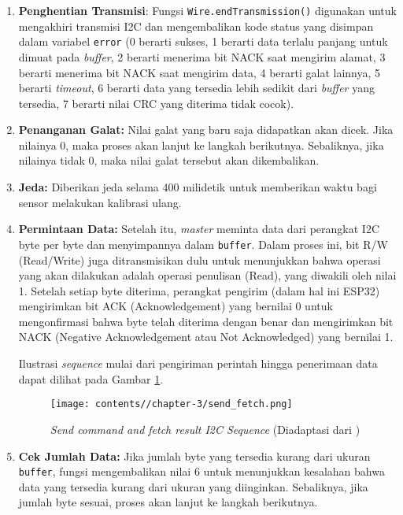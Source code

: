 \begin{enumerate}
            \item \textbf{Penghentian Transmisi}: Fungsi \texttt{Wire.endTransmission()} digunakan untuk mengakhiri transmisi I2C dan mengembalikan kode status yang disimpan dalam variabel \texttt{error} (0 berarti sukses, 1 berarti data terlalu panjang untuk dimuat pada \textit{buffer}, 2 berarti menerima bit NACK saat mengirim alamat, 3 berarti menerima bit NACK saat mengirim data, 4 berarti galat lainnya, 5 berarti \textit{timeout}, 6 berarti data yang tersedia lebih sedikit dari \textit{buffer} yang tersedia, 7 berarti nilai CRC yang diterima tidak cocok).

            \item \textbf{Penanganan Galat:} Nilai galat yang baru saja didapatkan akan dicek. Jika nilainya 0, maka proses akan lanjut ke langkah berikutnya. Sebaliknya, jika nilainya tidak 0, maka nilai galat tersebut akan dikembalikan. 

            \item \textbf{Jeda:} Diberikan jeda selama 400 milidetik untuk memberikan waktu bagi sensor melakukan kalibrasi ulang.
            
            \item \textbf{Permintaan Data:} Setelah itu, \textit{master} meminta data dari perangkat I2C byte per byte dan menyimpannya dalam \texttt{buffer}. Dalam proses ini, bit R/W (Read/Write) juga ditransmisikan dulu untuk menunjukkan bahwa operasi yang akan dilakukan adalah operasi penulisan (Read), yang diwakili oleh nilai 1. Setelah setiap byte diterima, perangkat pengirim (dalam hal ini ESP32) mengirimkan bit ACK (Acknowledgement) yang bernilai 0 untuk mengonfirmasi bahwa byte telah diterima dengan benar dan mengirimkan bit NACK (Negative Acknowledgement atau Not Acknowledged) yang bernilai 1. 

            Ilustrasi \textit{sequence} mulai dari pengiriman perintah hingga penerimaan data dapat dilihat pada Gambar \ref{fig:send_fetch}.

            \begin{figure}[H]
                \centering
                \texttt{[image: contents//chapter-3/send\_fetch.png]}
                \caption{\textit{Send command and fetch result I2C Sequence} (Diadaptasi dari \cite{scd4x_datasheet})}
                \label{fig:send_fetch}
            \end{figure}
            
            \item \textbf{Cek Jumlah Data:} Jika jumlah byte yang tersedia kurang dari ukuran \texttt{buffer}, fungsi mengembalikan nilai 6 untuk menunjukkan kesalahan bahwa data yang tersedia kurang dari ukuran yang diinginkan. Sebaliknya, jika jumlah byte sesuai, proses akan lanjut ke langkah berikutnya.
            

\end{enumerate}
